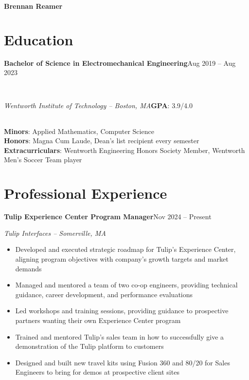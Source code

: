\documentclass[10pt]{article}
\newenvironment{onecolentry}{
    \begin{adjustwidth}{0.5cm}{0cm}
}{
    \end{adjustwidth}
}
\newenvironment{highlights}{
    \begin{itemize}[
        leftmargin=0.5cm,
        rightmargin=0cm,
        itemindent=0cm,
        labelwidth=0.3cm,
        labelsep=0.2cm,
        align=left,
        itemsep=0.05cm,
        topsep=0.05cm,
        parsep=0.05cm,
        partopsep=0pt
    ]
}{
    \end{itemize}
    \vspace{0.1cm}
}
\begin{document}
    \begin{center}
        \Huge\textbf{Brennan Reamer}

        \vspace{5pt}
    \end{center}

    \vspace{5pt}

    \section{Education}
    \begin{twocolentry}{\textbf{Bachelor of Science in Electromechanical Engineering}}{Aug 2019 -- Aug 2023}
    \end{twocolentry}\\
    \begin{twocolentry}
    {\textit{Wentworth Institute of Technology -- Boston, MA}}{\textbf{GPA}: 3.9/4.0}
    \end{twocolentry}\\
    \textbf{Minors}: Applied Mathematics, Computer Science\\
    \textbf{Honors}: Magna Cum Laude, Dean's list recipient every semester\\
    \textbf{Extracurriculars}: Wentworth Engineering Honors Society Member, Wentworth Men's Soccer Team player

    \section{Professional Experience}
    \begin{twocolentry}{\textbf{Tulip Experience Center Program Manager}}{Nov 2024 -- Present}
    \end{twocolentry}
    \begin{onecolentry}
    \textit{Tulip Interfaces -- Somerville, MA}
    \begin{highlights}
        \item Developed and executed strategic roadmap for Tulip's Experience Center, aligning program objectives with company's growth targets and market demands
        \item Managed and mentored a team of two co-op engineers, providing technical guidance, career development, and performance evaluations
        \item Led workshops and training sessions, providing guidance to prospective partners wanting their own Experience Center program
        \item Trained and mentored Tulip's sales team in how to successfully give a demonstration of the Tulip platform to customers
        \item Designed and built new travel kits using Fusion 360 and 80/20 for Sales Engineers to bring for demos at prospective client sites
    \end{highlights}
    \end{onecolentry}
\end{document}
